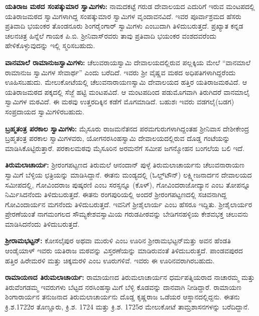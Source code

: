 \textbf{ಯತಿರಾಜ ಮಠದ ಸಂಪತ್ಕುಮಾರ ಸ್ವಾಮಿಗಳು:} ನಾಮದಕಟ್ಟೆ ಗರುಡ ದೇವಾಲಯದ ಎದುರಿಗೆ ಇರುವ ಮಂಟಪದಲ್ಲಿ ಯತಿರಾಜಮಠದ ಸ್ವಾಮಿಗಳಾಗಿದ್ದ ಸಂಪತ್ಕುಮಾರ ಸ್ವಾಮಿಗಳ ವೃಂದಾವನವಿದೆ. ಇವರ ಪೂರ್ವಾಶ್ರಮದ ಹೆಸರು ಪ್ರತಿವಾದಿ ಭಯಂಕರ ತೊಂಡನೂರು ಶಿಂಗರೈಂಗಾರ್​ ಸ್ವಾಮಿಗಳು ಎಂಬುದಾಗಿ ತಿಳಿದುಬರುತ್ತದೆ. ಪ್ರಖ್ಯಾತ ಕನ್ನಡ ಚಲನಚಿತ್ರ ಹಿನ್ನೆಲೆ ಗಾಯಕ ಪಿ.ಬಿ. ಶ‍್ರೀನಿವಾಸ್​ರವರು ತಾವು ಪ್ರತಿವಾದಿ ಭಯಂಕರ ವಂಶದವರೆಂದು ಹೇಳಿಕೊಳ್ಳುವುದನ್ನು ಇಲ್ಲಿ ಸ್ಮರಿಸಬಹುದು. 

\textbf{ ವಾನಮಾಲೆ ರಾಮಾನುಜಸ್ವಾಮಿಗಳು: } ಚೆಲುವರಾಯಸ್ವಾಮಿ ದೇವಾಲಯದಲ್ಲಿರುವ ಪಲ್ಲಕ್ಕಿಯ ಮೇಲೆ “ವಾನಮಾಲೆ ರಾಮಾನುಜ ಸ್ವಾಮಿಗಳ ಸೇವಾರ್ಥ” ಎಂದು ಬರೆದಿದೆ. ಇವರು ಶ‍್ರೀ ವೈಷ್ಣವ ಮಠದ ಅಧಿಪತಿಗಳಾಗಿದ್ದರೆಂದು ಊಹಿಸಬಹುದು. ಮೇಲುಕೋಟೆಯಲ್ಲಿ ಚೆಲುವನಾರಾಯಣಸ್ವಾಮಿ ದೇವಾಲಯದ ಹತ್ತಿರ ಯತಿರಾಜಮಠವಿದೆ. ಆ ಯತಿರಾಜಮಠದ ಪಕ್ಕದಲ್ಲಿ ಸೆಜ್ಜೆ ಹಟ್ಟಿ ಮಂಟಪವಿದೆ. ಆ ಮಂಟಪದಿಂದ ಪಡುಮೊಗವಾಗಿ ತಿರುಗಿದರೆ ವಾನಮಾಲೈ ಸ್ವಾಮಿಗಳ ಮಠವಿದೆ. ಈ ಮಠವು ಉತ್ತರದಿಕ್ಕಿನ ಕಡೆಗೆ ಮೊಗಮಾಡಿದೆ. ಬಹುಶಃ ಇವರು ವಡಗಲೈ(ಬಡಗ) ಸಂಪ್ರದಾಯದ ಸ್ವಾಮಿಗಳಿರಬಹುದು.

\textbf{ಬ್ರಹ್ಮತಂತ್ರ ಪರಕಾಲ ಸ್ವಾಮಿಗಳು:} ಮೈಸೂರು ರಾಜಮನೆತನದ ಪರಮಗುರುಗಳಾಗಿದ್ದಂತಹ ಶ‍್ರೀನಿವಾಸ ದೇಶೀಕೇಂದ್ರ ಬ್ರಹ್ಮತಂತ್ರ ಪರಕಾಲ ಸ್ವಾಮಿಗಳವರು, ಯೋಗನರಸಿಂಹಸ್ವಾಮಿ ದೇವಾಲಯದಲ್ಲಿರುವ ದೊಡ್ಡ ಗಂಟೆಯನ್ನು ಮಾಡಿಸಿಕೊಟ್ಟಿರುತ್ತಾರೆ. ಪರಕಾಲಮಠವು ಮೈಸೂರಿನ ಅರಮನೆಗೆ ಸಮೀಪ ಜಗನ್ಮೋಹನ ಬಂಗಲೆಯ ಬಲಿ ಇದೆ. 

\textbf{ತಿರುಮಲಾಚಾರ್ಯ:} ಶ‍್ರೀರಂಗಪಟ್ಟಣದ ತಿರುಮಲೆ ಆನಂದಾನ್​ ಪುಳ್ಳೆ ತಿರುಮಲಾಚಾರ್ಯನು ಚೆಲುವನಾರಾಯಣ ಸ್ವಾಮಿಗೆ ಬೆಳ್ಳಿಯ ಛತ್ರಿಯನ್ನು ಮಾಡಿಸಿದ್ದಾನೆ. ಈತನು ಮಂಡ್ಯದಲ್ಲಿ (ಓಲ್ಡ್​ಟೌನ್​) ಲಕ್ಷ್ಮೀಜನಾರ್ದನ ದೇವಾಲಯದ ಸಮೀಪದಲ್ಲಿ, ಗೋವಿಂದರಾಜ ಪುಷ್ಕರಣಿ ಎಂಬ ಸರಸ್ಸನ್ನೂ (ಕೊಳ್​), ಗೋವಿಂದರಾಜೋದ್ಯಾನ ಎಂಬ ತೋಪನ್ನೂ ನಿರ್ಮಿಸಿದನೆಂದು ತಿಳಿದುಬರುತ್ತದೆ. ಈತನು ರಂಗಪುರಿಯಲ್ಲಿ ಅಂದರೆ ಶ‍್ರೀರಂಗಪಟ್ಟಣದಲ್ಲಿ ಸಚಿವನಾಗಿದ್ದ ಗೋವಿಂದಾರ್ಯನ ಮಗನೆಂದು ತಿಳಿದುಬರುತ್ತದೆ. ಇವನಿಗೆ ಶ‍್ರೀಶೈಲಾರ್ಯ ಎಂಬ ಹೆಸರೂ ಇದ್ದಿತು. ಶ‍್ರೀಶೈಲಾರ್ಯರ ಪ್ರೇರಣೆಯಂತೆ ನಾಗಮಂಗಲದ ಸೌಮ್ಯಕೇಶವಸ್ವಾಮಿಯ ಗರುಡಪೀಠವನ್ನು ಬೇಡಿಗನಹಳ್ಳಿಯ ಕೇಶವಭಕ್ತ ಚಲುವನು ಮಾಡಿಸಿದನೆಂದು ತಿಳಿದುಬರುತ್ತದೆ.

\textbf{ಶ‍್ರೀರಾಮಭಟ್ಟನ್​:} ಕೋಸಲೈಪುರ ಅಥವಾ ಮುರುಳಿ ಎಂಬ ಊರಿನ ಶ‍್ರೀರಾಮಭಟ್ಟನ್​ ಮತ್ತು ಅವನ ಹೆಂಡತಿ ಆಂಡೈಯಾಳ್​ ಇವರು ಯತಿರಾಜ ಮಠವನ್ನು ವಿಸ್ತರಣೆಯನ್ನು ಮಾಡಿರುವಂತೆ ತಿಳಿದುಬರುತ್ತದೆ. ಪಾಂಡವಪುರದ ಹತ್ತಿರ ಹಿರೇಮರಳಿ ಮತ್ತು ಚಿಕ್ಕಮರಳಿ ಎಂಬ ಊರುಗಳಿವೆ. ಇವರು ಈ ಊರಿನವರಾಗಿರಬಹುದು.

\textbf{ರಾಮಾಯಣದ ತಿರುಮಲಾಚಾರ್ಯ:} ರಾಮಾಯಣದ ತಿರುಮಲಾಚಾರ್ಯನ ಧರ್ಮಪತ್ನಿಯರಾದ ನಾಚಾರಮ್ಮ ಮತ್ತು ತಿರುವೆಂಗಡಮ್ಮ ಇವರುಗಳು ಬೆಟ್ಟದ ನರಸಿಂಹಸ್ವಾಮಿಗೆ ಬೆಳ್ಳಿ ಕೊಡವನ್ನು ದಾನವಾಗಿ ನೀಡಿದ್ದಾರೆ. ರಾಮಾಯಣ ಶಿಂಗಾರಾರ್ಯನ ತನುಜನಾದ ತಿರುಮಲಾಚಾರ್ಯನು ದೊಡ್ಡ ಕೃಷ್ಣರಾಜ ಒಡೆಯರ ಆಸ್ಥಾನದಲ್ಲಿದ್ದನು. ಈತನು ಕ್ರಿ.ಶ.1722ರ ತೊಣ್ಣೂರು, ಕ್ರಿ.ಶ. 1724 ಮತ್ತು ಕ್ರಿ.ಶ. 1725ರ ಮೇಲುಕೋಟೆ ತಾಮ್ರಶಾಸನಗಳನ್ನು ಬರೆದಿದ್ದಾನೆ.

